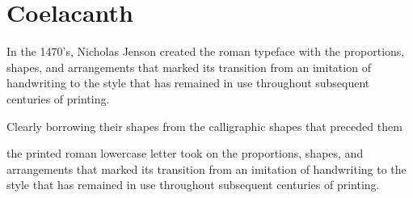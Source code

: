 \chapter[coelacanth]{Coelacanth}

In the 1470’s, Nicholas Jenson created the roman typeface with the proportions, shapes, and arrangements that marked its transition from an imitation of handwriting to the style that has remained in use throughout subsequent centuries of printing.


Clearly borrowing their shapes from the calligraphic shapes that preceded them

the printed roman lowercase letter took on the proportions, shapes, and arrangements that marked its transition from an imitation of handwriting to the style that has remained in use throughout subsequent centuries of printing.  

